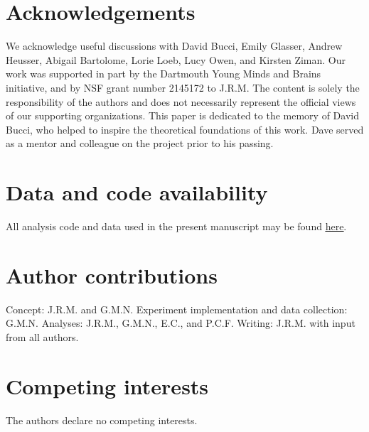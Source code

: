 \documentclass[10pt]{article}
\begin{document}
   


\section*{Acknowledgements}
We acknowledge useful discussions with David Bucci, Emily Glasser,
Andrew Heusser, Abigail Bartolome, Lorie Loeb, Lucy Owen, and Kirsten
Ziman.  Our work was supported in part by the Dartmouth Young Minds
and Brains initiative, and by NSF grant number 2145172 to J.R.M.  The
content is solely the responsibility of the authors and does not
necessarily represent the official views of our supporting
organizations.  This paper is dedicated to the memory of David Bucci,
who helped to inspire the theoretical foundations of this work.  Dave
served as a mentor and colleague on the project prior to his passing.


\section*{Data and code availability}
All analysis code and data used in the present manuscript may be found
\href{https://github.com/ContextLab/brainfit-paper}{\underline{here}}.

\section*{Author contributions}
Concept: J.R.M. and G.M.N.  Experiment implementation and data collection: G.M.N.
Analyses: J.R.M., G.M.N., E.C., and P.C.F.  Writing: J.R.M. with input
from all authors.

\section*{Competing interests}
The authors declare no competing interests.



\end{document}
